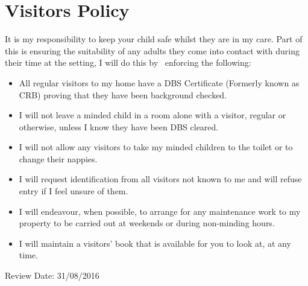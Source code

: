 

\section{Visitors Policy}

It is my responsibility to keep your child safe whilst they are in my
care. Part of this is ensuring the suitability of any adults they come
into contact with during their time at the setting, I will do this by
~enforcing the following:

\begin{itemize}
\item
  All regular visitors to my home have a DBS Certificate (Formerly
  known as CRB) proving that they have been background checked.
\end{itemize}

\begin{itemize}
\item
  I will not leave a minded child in a room alone with a visitor,
  regular or otherwise, unless I know they have been DBS cleared.~
\item
  I will not allow any visitors to take my minded children to the
  toilet or to change their nappies.
\end{itemize}

\begin{itemize}
\item
  I will request identification from all visitors not known to me and
  will refuse entry if I feel unsure of them.
\end{itemize}

\begin{itemize}
\item
  I will endeavour, when possible, to arrange for any maintenance work
  to my property to be carried out at weekends or during non-minding
  hours.
\end{itemize}

\begin{itemize}
\item
  I will maintain a visitors' book that is available for you to look
  at, at any time.
\end{itemize}

Review Date: 31/08/2016


